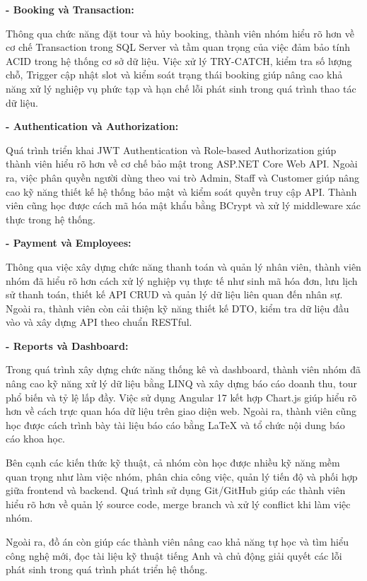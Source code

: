 \vspace{0.5cm}

\noindent\textbf{- Booking và Transaction:}

Thông qua chức năng đặt tour và hủy booking, thành viên nhóm hiểu rõ hơn
về cơ chế Transaction trong SQL Server và tầm quan trọng của việc đảm bảo tính
ACID trong hệ thống cơ sở dữ liệu. Việc xử lý TRY-CATCH, kiểm tra số lượng chỗ,
Trigger cập nhật slot và kiểm soát trạng thái booking giúp nâng cao khả năng
xử lý nghiệp vụ phức tạp và hạn chế lỗi phát sinh trong quá trình thao tác dữ liệu.

\vspace{0.5cm}

\noindent\textbf{- Authentication và Authorization:}

Quá trình triển khai JWT Authentication và Role-based Authorization giúp thành viên
hiểu rõ hơn về cơ chế bảo mật trong ASP.NET Core Web API. Ngoài ra, việc phân quyền
người dùng theo vai trò Admin, Staff và Customer giúp nâng cao kỹ năng thiết kế hệ thống
bảo mật và kiểm soát quyền truy cập API. Thành viên cũng học được cách mã hóa mật khẩu
bằng BCrypt và xử lý middleware xác thực trong hệ thống.

\vspace{0.5cm}

\noindent\textbf{- Payment và Employees:}

Thông qua việc xây dựng chức năng thanh toán và quản lý nhân viên, thành viên nhóm
đã hiểu rõ hơn cách xử lý nghiệp vụ thực tế như sinh mã hóa đơn, lưu lịch sử thanh toán,
thiết kế API CRUD và quản lý dữ liệu liên quan đến nhân sự. Ngoài ra, thành viên còn cải thiện
kỹ năng thiết kế DTO, kiểm tra dữ liệu đầu vào và xây dựng API theo chuẩn RESTful.

\vspace{0.5cm}

\noindent\textbf{- Reports và Dashboard:}

Trong quá trình xây dựng chức năng thống kê và dashboard, thành viên nhóm đã nâng cao
kỹ năng xử lý dữ liệu bằng LINQ và xây dựng báo cáo doanh thu, tour phổ biến và tỷ lệ lấp đầy.
Việc sử dụng Angular 17 kết hợp Chart.js giúp hiểu rõ hơn về cách trực quan hóa dữ liệu trên giao diện web.
Ngoài ra, thành viên cũng học được cách trình bày tài liệu báo cáo bằng LaTeX và tổ chức nội dung báo cáo khoa học.

\vspace{0.5cm}

Bên cạnh các kiến thức kỹ thuật, cả nhóm còn học được nhiều kỹ năng mềm quan trọng như
làm việc nhóm, phân chia công việc, quản lý tiến độ và phối hợp giữa frontend và backend.
Quá trình sử dụng Git/GitHub giúp các thành viên hiểu rõ hơn về quản lý source code,
merge branch và xử lý conflict khi làm việc nhóm.

Ngoài ra, đồ án còn giúp các thành viên nâng cao khả năng tự học và tìm hiểu công nghệ mới,
đọc tài liệu kỹ thuật tiếng Anh và chủ động giải quyết các lỗi phát sinh trong quá trình phát triển hệ thống.
